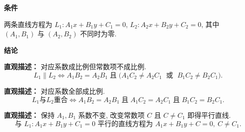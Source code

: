 \begin{statementbox}
	\textbf{\textcolor{CStatement}{条件}}
	\begin{description}[style=nextline, leftmargin=2.8em, labelsep=0.5em, itemsep=0.35em]
		\item[\textbf{\textcolor{CStatement}{条件1（一般式形式）：}}]
			两条直线方程为 $L_1: A_1x+B_1y+C_1=0$, $L_2: A_2x+B_2y+C_2=0$, 其中 $(A_1,B_1)$ 与 $(A_2,B_2)$ 不同时为零.
	\end{description}
	\textbf{\textcolor{CStatement}{结论}}
	\begin{description}[style=nextline, leftmargin=2.8em, labelsep=0.5em, itemsep=0.45em]
		\item[\textbf{\textcolor{CStatement}{结论一（平行判定）：}}]
			\textbf{\textcolor{CStatement}{直观描述：}}
			对应系数成比例但常数项不成比例.
			\[
				L_1\parallel L_2 \iff A_1B_2 = A_2B_1 \;\text{且}\; \bigl( A_1C_2 \neq A_2C_1 \;\text{ 或 }\; B_1C_2 \neq B_2C_1 \bigr).
			\]
		\item[\textbf{\textcolor{CStatement}{结论二（重合判定）：}}]
			\textbf{\textcolor{CStatement}{直观描述：}}
			对应系数全部成比例.
			\[
				L_1 \text{与} L_2 \text{重合} \iff A_1B_2 = A_2B_1 \;\text{且}\; A_1C_2 = A_2C_1 \;\text{且}\; B_1C_2 = B_2C_1.
			\]
		\item[\textbf{\textcolor{CStatement}{推广结论（平行直线系）：}}]
			\textbf{\textcolor{CStatement}{直观描述：}}
			保持 $A_1,B_1$ 系数不变, 改变常数项 $C$ 且 $C\neq C_1$ 即得平行直线.
			\[
				\text{与 }L_1:A_1x+B_1y+C_1=0\text{ 平行的直线方程为 }A_1x+B_1y+C=0,\ C\neq C_1.
			\]
	\end{description}

\end{statementbox}

